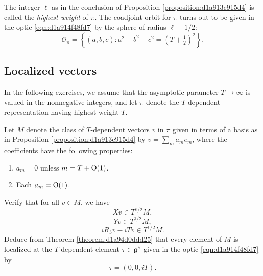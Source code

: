 \documentclass[reqno]{amsart} 
\numberwithin{equation}{section}
\begin{document}
The integer $\ell$ as in the conclusion of Proposition \ref{proposition:d1a913c915d4} is called the \emph{highest weight} of $\pi$.  The coadjoint orbit for $\pi$ turns out to be given in the optic \eqref{eqn:d1a914f48fd7} by the sphere of radius $\ell + 1/2$:
\begin{equation*}
\mathcal{O}_\pi = \left\{ (a,b,c) : a^2 + b^2 + c^2 = (T + \tfrac{1}{2} )^2 \right\}.
\end{equation*}

\subsection{Localized vectors}\label{sec:d1a9162ebd8a}
In the following exercises, we assume that the asymptotic parameter $T \rightarrow \infty$ is valued in the nonnegative integers, and let $\pi$ denote the $T$-dependent representation having highest weight $T$.

\begin{exercise}\label{exercise:d1a913e1e9ec}
  Let $M$ denote the class of $T$-dependent vectors $v$ in $\pi$ given in terms of a basis as in Proposition \ref{proposition:d1a913c915d4} by $v = \sum_m a_m e_m$, where the coefficients have the following properties:
  \begin{enumerate}
  \item $a_m = 0$ unless $m = T + \operatorname{O}(1)$.
  \item Each $a_m = \operatorname{O}(1)$.
  \end{enumerate}
  Verify that for all $v \in M$, we have
  \begin{equation*}
    X v \in T^{1/2} M,
  \end{equation*}
  \begin{equation*}
    Y v \in T^{1/2} M,
  \end{equation*}
  \begin{equation*}
    i R_3 v - i T v \in T^{1/2} M.
  \end{equation*}
  Deduce from Theorem \ref{theorem:d1a94d0ddd25} that every element of $M$ is localized at the $T$-dependent element $\tau \in \mathfrak{g}^\wedge$ given in the optic \eqref{eqn:d1a914f48fd7} by
  \begin{equation*}
    \tau = (0,0,i T).
  \end{equation*}
\end{exercise}
\end{document}
